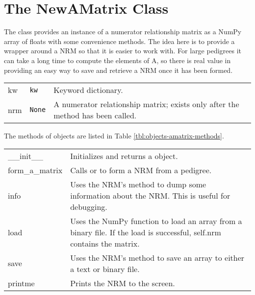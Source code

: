 \section{The NewAMatrix Class}
\label{sec:objects-amatrix-objects}
The  class provides an instance of a numerator relationship matrix as a NumPy array of floats with some convenience methods.  The idea here is to provide a wrapper around a NRM so that it is easier to work with.  For large pedigrees it can take a long time to compute the elements of A, so there is real value in providing an easy way to save and retrieve a NRM once it has been formed.
\begin{center}
    \tablelasttail{\hline}
    \label{tbl:objects-amatrix-attributes}
    \begin{xtabular}{l|l|p{4in}}
        kw & \texttt{kw} & Keyword dictionary. \\
        nrm & \texttt{None} & A numerator relationship matrix; exists only after the  method has been called. \\
    \end{xtabular}
\end{center}
The methods of  objects are listed in Table \ref{tbl:objects-amatrix-methods}.
\begin{center}
    \tablelasttail{\hline}
    \label{tbl:objects-amatrix-methods}
    \begin{xtabular}{l|p{4in}}
        \_\_init\_\_ & Initializes and returns a  object. \\
        form\_a\_matrix & Calls  or  to form a NRM from a pedigree. \\
        info & Uses the NRM's  method to dump some information about the NRM. This is useful for debugging. \\
        load & Uses the NumPy function  to load an array from a binary file.  If the load is successful, self.nrm contains the matrix. \\
        save & Uses the NRM's  method to save an array to either a text or binary file. \\
        printme & Prints the NRM to the screen. \\
    \end{xtabular}
\end{center}